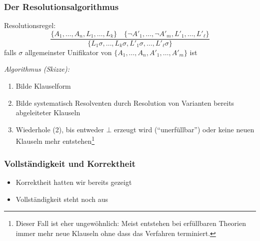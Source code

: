 \documentclass[aspectratio=1610,onlymath]{beamer}
\begin{document}
\maketitle


% 

\begin{frame}\frametitle{Der Resolutionsalgorithmus}

Resolutionsregel:
\[  \frac{
\{A_1,\ldots,A_n,L_1,\ldots,L_k\}\quad
\{\neg A'_1,\ldots,\neg A'_m,L'_1,\ldots,L'_\ell\}
}{\{L_1\sigma,\ldots,L_k\sigma,L'_1\sigma,\ldots,L'_\ell\sigma\}
}\]
falls $\sigma$ allgemeinster Unifikator von $\{A_1,\ldots,A_n, A'_1,\ldots, A'_m\}$ ist\bigskip

\emph{Algorithmus (Skizze):}
\begin{enumerate}[(1)]
\item Bilde Klauselform
\item Bilde systematisch Resolventen durch Resolution von Varianten bereits abgeleiteter Klauseln
\item Wiederhole (2), bis entweder $\bot$ erzeugt wird ("`unerfüllbar"') oder keine neuen Klauseln mehr entstehen\footnote{Dieser Fall ist eher ungewöhnlich: Meist entstehen bei erfüllbaren Theorien immer mehr neue Klauseln ohne dass das Verfahren terminiert.}
\end{enumerate}

\end{frame}

\begin{frame}\frametitle{Vollständigkeit und Korrektheit}


\begin{itemize}
\item Korrektheit hatten wir bereits gezeigt
\item Vollständigkeit steht noch aus
\end{itemize}

\end{frame}
\end{document}
